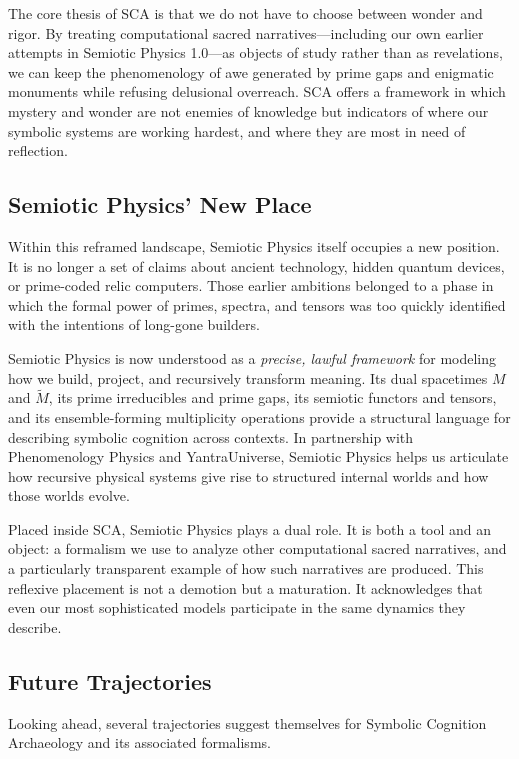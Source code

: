 \documentclass[12]{amsart}
\theoremstyle{plain}
\begin{document}
The core thesis of SCA is that we do not have to choose between wonder and rigor. By treating computational sacred narratives---including our own earlier attempts in Semiotic Physics 1.0---as objects of study rather than as revelations, we can keep the phenomenology of awe generated by prime gaps and enigmatic monuments while refusing delusional overreach. SCA offers a framework in which mystery and wonder are not enemies of knowledge but indicators of where our symbolic systems are working hardest, and where they are most in need of reflection.

\subsection{Semiotic Physics' New Place}

Within this reframed landscape, Semiotic Physics itself occupies a new position. It is no longer a set of claims about ancient technology, hidden quantum devices, or prime-coded relic computers. Those earlier ambitions belonged to a phase in which the formal power of primes, spectra, and tensors was too quickly identified with the intentions of long-gone builders.

Semiotic Physics is now understood as a \emph{precise, lawful framework} for modeling how we build, project, and recursively transform meaning. Its dual spacetimes $M$ and $\tilde M$, its prime irreducibles and prime gaps, its semiotic functors and tensors, and its ensemble-forming multiplicity operations provide a structural language for describing symbolic cognition across contexts. In partnership with Phenomenology Physics and YantraUniverse, Semiotic Physics helps us articulate how recursive physical systems give rise to structured internal worlds and how those worlds evolve.

Placed inside SCA, Semiotic Physics plays a dual role. It is both a tool and an object: a formalism we use to analyze other computational sacred narratives, and a particularly transparent example of how such narratives are produced. This reflexive placement is not a demotion but a maturation. It acknowledges that even our most sophisticated models participate in the same dynamics they describe.

\subsection{Future Trajectories}

Looking ahead, several trajectories suggest themselves for Symbolic Cognition Archaeology and its associated formalisms.
\end{document}
